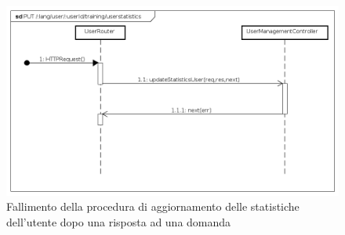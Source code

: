 \begin{itemize}
\begin{figure}[ht]
	\centering
	\includegraphics[scale=0.45]{UML/DiagrammiDiSequenza/Back-end/PUT__lang_user__userId_training_userstatistics_failure.png}
	\caption{Fallimento della procedura di aggiornamento delle statistiche dell'utente dopo una risposta ad una domanda}
\end{figure}
\FloatBarrier

\end{itemize}


